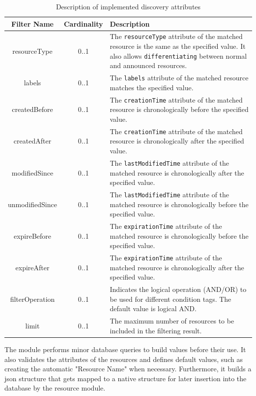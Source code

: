 \documentclass[a4paper,fleqn]{cas-dc}
\begin{document}
\begin{table}[ht]
\scriptsize
\centering
\caption{Description of implemented discovery attributes}
\label{tab:discovery_attributes}
\begin{tabular}{c c p{4cm}}
\hline
\textbf{Filter Name} & \textbf{Cardinality} & \textbf{Description} \\
\hline \hline
resourceType & 0..1 & The \texttt{resourceType} attribute of the matched resource is the same as the specified value. It also allows \texttt{differentiating} between normal and announced resources. \\
labels & 0..1 & The \texttt{labels} attribute of the matched resource matches the specified value. \\
createdBefore & 0..1 & The \texttt{creationTime} attribute of the matched resource is chronologically before the specified value. \\
createdAfter & 0..1 & The \texttt{creationTime} attribute of the matched resource is chronologically after the specified value. \\
modifiedSince & 0..1 & The \texttt{lastModifiedTime} attribute of the matched resource is chronologically after the specified value. \\
unmodifiedSince & 0..1 & The \texttt{lastModifiedTime} attribute of the matched resource is chronologically before the specified value. \\
expireBefore & 0..1 & The \texttt{expirationTime} attribute of the matched resource is chronologically before the specified value. \\
expireAfter & 0..1 & The \texttt{expirationTime} attribute of the matched resource is chronologically after the specified value. \\
filterOperation & 0..1 & Indicates the logical operation (AND/OR) to be used for different condition tags. The default value is logical AND. \\
limit & 0..1 & The maximum number of resources to be included in the filtering result. \\
\hline
\end{tabular}
\end{table}

The module performs minor database queries to build values before their use. It also validates the attributes of the resources and defines default values, such as creating the automatic "Resource Name" when necessary. Furthermore, it builds a \gls{json} structure that gets mapped to a native structure for later insertion into the database by the resource module.
\end{document}
